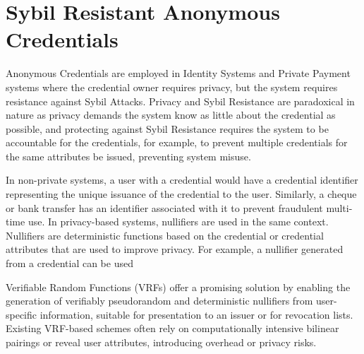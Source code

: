 \newpage
\section{Sybil Resistant Anonymous Credentials}
Anonymous Credentials are employed in Identity Systems and Private Payment systems where the credential owner requires privacy, but the system requires resistance against Sybil Attacks. Privacy and Sybil Resistance are paradoxical in nature as privacy demands the system know as little about the credential as possible, and protecting against Sybil Resistance requires the system to be accountable for the credentials, for example, to prevent multiple credentials for the same attributes be issued, preventing system misuse. 

In non-private systems, a user with a credential would have a credential identifier representing the unique issuance of the credential to the user. Similarly, a cheque or bank transfer has an identifier associated with it to prevent fraudulent multi-time use. In privacy-based systems, nullifiers are used in the same context. Nullifiers are deterministic functions based on the credential or credential attributes that are used to improve privacy. For example, a nullifier generated from a credential can be used 

 Verifiable Random Functions (VRFs) offer a promising solution by enabling the generation of verifiably pseudorandom and deterministic nullifiers from user-specific information, suitable for presentation to an issuer or for revocation lists. Existing VRF-based schemes often rely on computationally intensive bilinear pairings or reveal user attributes, introducing overhead or privacy risks.



